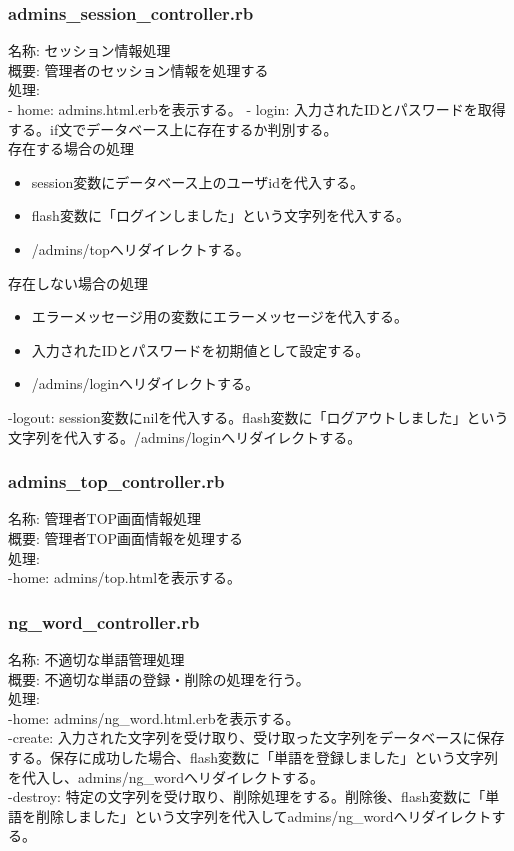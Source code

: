 \documentclass[a4j]{jarticle}
\begin{document}
\subsubsection{admins\_session\_controller.rb}
\noindent 名称: セッション情報処理 \\
概要: 管理者のセッション情報を処理する \\
処理:  \\
- home: admins.html.erbを表示する。
- login: 入力されたIDとパスワードを取得する。if文でデータベース上に存在するか判別する。\\
存在する場合の処理\\
\begin{itemize}
\item session変数にデータベース上のユーザidを代入する。
\item flash変数に「ログインしました」という文字列を代入する。
\item /admins/topへリダイレクトする。\\
\end{itemize}
存在しない場合の処理\\
\begin{itemize}
\item エラーメッセージ用の変数にエラーメッセージを代入する。
\item 入力されたIDとパスワードを初期値として設定する。
\item /admins/loginへリダイレクトする。\\
\end{itemize}
-logout: session変数にnilを代入する。flash変数に「ログアウトしました」という文字列を代入する。/admins/loginへリダイレクトする。

\subsubsection{admins\_top\_controller.rb}
\noindent 名称: 管理者TOP画面情報処理 \\
概要: 管理者TOP画面情報を処理する \\
処理:  \\
-home: admins/top.htmlを表示する。

\subsubsection{ng\_word\_controller.rb}
\noindent 名称: 不適切な単語管理処理 \\
概要: 不適切な単語の登録・削除の処理を行う。 \\
処理:  \\
-home: admins/ng\_word.html.erbを表示する。\\
-create: 入力された文字列を受け取り、受け取った文字列をデータベースに保存する。保存に成功した場合、flash変数に「単語を登録しました」という文字列を代入し、admins/ng\_wordへリダイレクトする。\\
-destroy: 特定の文字列を受け取り、削除処理をする。削除後、flash変数に「単語を削除しました」という文字列を代入してadmins/ng\_wordへリダイレクトする。
\end{document}
